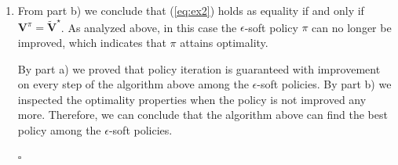 \begin{Solution}
\begin{enumerate} [label=\alph*)]
$$\begin{aligned}
        & = (1-\epsilon) \max_{a \in \mathcal{A}} \sum_{s' \in \mathcal{S}} P(s^\prime \mid s, a) \left ( r(s' \mid s, a) + \gamma \boldsymbol{V}^{\pi_t} (s') \right ) + \frac{\epsilon}{|\mathcal{A}|} \sum_{a' \in \mathcal{A}} \sum_{s' \in \mathcal{S}} P(s^\prime \mid s, a') \left (r(s' \mid s, a') + \gamma \boldsymbol{V}^{\pi_t} (s') \right )
        \end{aligned}
        $$
        Observe that the two equations above are the same, except for the substitution of $\boldsymbol{V}^{\pi_t}$ for $\boldsymbol{\widetilde{V}}^\star$. Because $\boldsymbol{\widetilde{V}}^\star$ is the unique solution, it must hold that $\boldsymbol{V}^{\pi_t} = \boldsymbol{\widetilde{V}}^\star$. \footnote{Some ideas in the proof workflow above come from \cite{cs234}.} \begin{flushright} $\square$ \end{flushright}
        
        \item
        From part b) we conclude that (\ref{eq:ex2}) holds as equality if and only if $\boldsymbol{V}^{\pi} = \boldsymbol{\widetilde{V}}^\star$. As analyzed above, in this case the $\epsilon$-soft policy $\pi$ can no longer be improved, which indicates that $\pi$ attains optimality.
        
        By part a) we proved that policy iteration is guaranteed with improvement on every step of the algorithm above among the $\epsilon$-soft policies. By part b) we inspected the optimality properties when the policy is not improved any more. Therefore, we can conclude that the algorithm above can find the best policy among the $\epsilon$-soft policies. \begin{flushright} $\square$ \end{flushright}
    \end{enumerate}
\end{Solution}

\clearpage
\newpage
